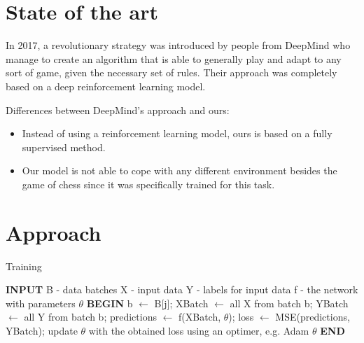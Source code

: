 \documentclass[runningheads,a4paper,11pt]{report}
\begin{document}
\chapter{State of the art}
\label{chapter:stateOfArt}


In 2017, a revolutionary strategy was introduced by people from DeepMind who manage to create an algorithm that is able to generally play and adapt to any sort of game, given the necessary set of rules. Their approach was completely based on a deep reinforcement learning model.

Differences between DeepMind's approach and ours:
\begin{itemize}
	 \item Instead of using a reinforcement learning model, ours is based on a fully supervised method.
	 \item Our model is not able to cope with any different environment besides the game of chess since it was specifically trained for this task. 
\end{itemize}

\chapter{Approach}

\begin{algorithm}
	\caption{Training}
	\label{BestMove}
		\begin{algorithmic}
        
        \STATE \textbf{INPUT}
        \STATE B - data batches
        \STATE X - input data
        \STATE Y - labels for input data
        \STATE f - the network with parameters $\theta$
        \STATE \textbf{BEGIN}
                \STATE b $\leftarrow$ B[j];
                \STATE XBatch $\leftarrow$ all X from batch b;
                \STATE YBatch $\leftarrow$ all Y from batch b;
                \STATE predictions $\leftarrow$ f(XBatch, $\theta$);
                \STATE loss $\leftarrow$ MSE(predictions, YBatch);
                \STATE update $\theta$ with the obtained loss using an optimer, e.g. Adam
            \ENDFOR
        \ENDFOR
        \RETURN $\theta$
  		\STATE \textbf{END}
\end{algorithmic}
\end{algorithm}
\end{document}
